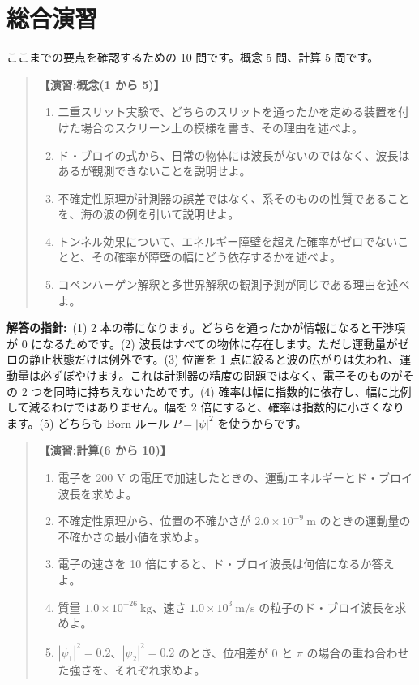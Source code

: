 \documentclass{article}
\begin{document}
\section{総合演習}

ここまでの要点を確認するための 10 問です。概念 5 問、計算 5 問です。

\begin{quote}
\textbf{【演習:概念(1 から 5)】}
\begin{enumerate}
\item 二重スリット実験で、どちらのスリットを通ったかを定める装置を付けた場合のスクリーン上の模様を書き、その理由を述べよ。
\item ド・ブロイの式から、日常の物体には波長がないのではなく、波長はあるが観測できないことを説明せよ。
\item 不確定性原理が計測器の誤差ではなく、系そのものの性質であることを、海の波の例を引いて説明せよ。
\item トンネル効果について、エネルギー障壁を超えた確率がゼロでないことと、その確率が障壁の幅にどう依存するかを述べよ。
\item コペンハーゲン解釈と多世界解釈の観測予測が同じである理由を述べよ。
\end{enumerate}
\end{quote}

\textbf{解答の指針:}\ (1) 2 本の帯になります。どちらを通ったかが情報になると干渉項が 0 になるためです。(2) 波長はすべての物体に存在します。ただし運動量がゼロの静止状態だけは例外です。(3) 位置を 1 点に絞ると波の広がりは失われ、運動量は必ずぼやけます。これは計測器の精度の問題ではなく、電子そのものがその 2 つを同時に持ちえないためです。(4) 確率は幅に指数的に依存し、幅に比例して減るわけではありません。幅を 2 倍にすると、確率は指数的に小さくなります。(5) どちらも Born ルール \( P = |\psi|^2 \) を使うからです。

\begin{quote}
\textbf{【演習:計算(6 から 10)】}
\begin{enumerate}
\item 電子を 200 V の電圧で加速したときの、運動エネルギーとド・ブロイ波長を求めよ。
\item 不確定性原理から、位置の不確かさが \( 2.0 \times 10^{-9} \ \mathrm{m} \) のときの運動量の不確かさの最小値を求めよ。
\item 電子の速さを 10 倍にすると、ド・ブロイ波長は何倍になるか答えよ。
\item 質量 \(1.0 \times 10^{-26} \ \mathrm{kg} \)、速さ \(1.0 \times 10^{3} \ \mathrm{m/s} \) の粒子のド・ブロイ波長を求めよ。
\item \( |\psi_1|^2 = 0.2 \)、\( |\psi_2|^2 = 0.2 \) のとき、位相差が 0 と \(\pi\) の場合の重ね合わせた強さを、それぞれ求めよ。
\end{enumerate}
\end{quote}
\end{document}
